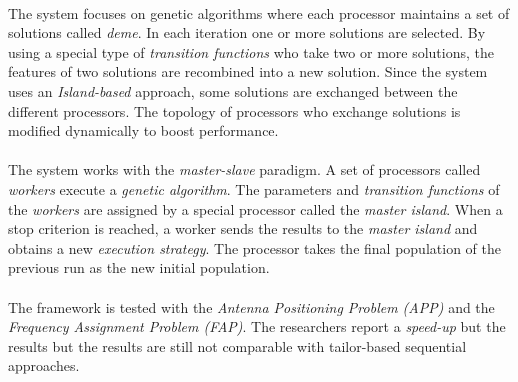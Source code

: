 \documentclass[a4paper,10pt]{article}
\theoremstyle{definition}
\begin{document}
\paragraph{}
The system focuses on genetic algorithms where each processor maintains a set of solutions called \emph{deme}. In each iteration one or more solutions are selected. By using a special type of \emph{transition functions} who take two or more solutions, the features of two solutions are recombined into a new solution. Since the system uses an \emph{Island-based} approach, some solutions are exchanged between the different processors. The topology of processors who exchange solutions is modified dynamically to boost performance.

\paragraph{}
The system works with the \emph{master-slave} paradigm. A set of processors called \emph{workers} execute a \emph{genetic algorithm}. The parameters and \emph{transition functions} of the \emph{workers} are assigned by a special processor called the \emph{master island}. When a stop criterion is reached, a worker sends the results to the \emph{master island} and obtains a new \emph{execution strategy}. The processor takes the final population of the previous run as the new initial population.%

\paragraph{}
The framework is tested with the \emph{Antenna Positioning Problem (APP)}\cite{} and the \emph{Frequency Assignment Problem (FAP)}\cite{}. The researchers report a \emph{speed-up} but the results but the results are still not comparable with tailor-based sequential approaches.


\end{document}
